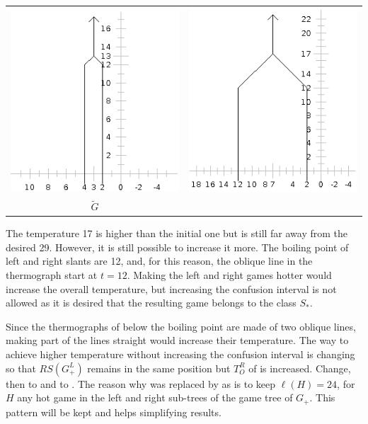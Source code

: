 \begin{center}
\begin{tabular}{cc}
\includegraphics[scale=0.5]{../images/gtherm.png} & \includegraphics[scale=0.5]{../images/gplus.png} \\
$\tilde{G}$ & \Gm{_+} \\
\end{tabular}
\end{center}

The temperature 17 is higher than the initial one but is still far away from the desired 29. However, it is still possible to increase it more. The boiling point of left and right slants are 12, and, for this reason, the oblique line in the thermograph start at $t=12$. Making the left and right games hotter would increase the overall temperature, but increasing the confusion interval is not allowed as it is desired that the resulting game belongs to the class $S_*$.

Since the thermographs of  below the boiling point are made of two oblique lines, making part of the lines straight would increase their temperature. The way to achieve higher temperature without increasing the confusion interval is changing  so that $RS(G_+^{L})$ remains in the same position but $T^R_O$ of  is increased. Change, then  to  and  to . The reason why  was replaced by  as  is to keep $\ell(H) = 24$, for $H$ any hot game in the left and right sub-trees of the game tree of $G_+$. This pattern will be kept and helps simplifying results.

